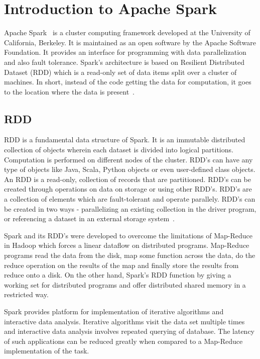 \section{Introduction to Apache Spark}

Apache Spark~\cite{hid-sp18-408-ApacheSpark} is a cluster computing framework developed 
at the University of California, Berkeley. It is maintained as an open software 
by the Apache Software Foundation. It provides an interface for programming with 
data parallelization and also fault tolerance. Spark's architecture is based on 
Resilient Distributed Dataset (RDD) which is a read-only set of data items split
over a cluster of machines. In short, instead of the code getting the data for 
computation, it goes to the location where the data is present~\cite{hid-sp18-408-Spark}. 

\subsection{RDD}
RDD is a fundamental data structure of Spark. It is an immutable distributed 
collection of objects wherein each dataset is divided into logical partitions. 
Computation is performed on different nodes of the cluster. RDD's can have any 
type of objects like Java, Scala, Python objects or even user-defined class 
objects. An RDD is a read-only, collection of records that are partitioned. 
RDD's can be created through operations on data on storage or using other RDD's.
RDD's are a collection of elements which are fault-tolerant and operate 
parallely. RDD's can be created in two ways - parallelizing an existing 
collection in the driver program, or referencing a dataset in an external 
storage system~\cite{hid-sp18-408-Spark-RDD}.

Spark and its RDD's were developed to overcome the limitations of Map-Reduce in 
Hadoop which forces a linear dataflow on distributed programs. Map-Reduce 
programs read the data from the disk, map some function across the data, do the 
reduce operation on the results of the map and finally store the results from 
reduce onto a disk. On the other hand, Spark's RDD function by giving a working 
set for distributed programs and offer distributed shared memory in a restricted
way. 

Spark provides platform for implementation of iterative algorithms and 
interactive data analysis. Iterative algorithms visit the data set multiple 
times and interactive data analysis involves repeated querying of database. 
The latency of such applications can be reduced greatly when compared to a 
Map-Reduce implementation of the task. 

